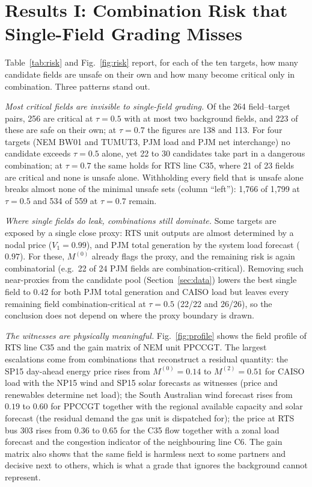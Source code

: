 \section{Results I: Combination Risk that Single-Field Grading Misses}\label{sec:res-risk}



Table~\ref{tab:risk} and Fig.~\ref{fig:risk} report, for each of the ten targets, how many
candidate fields are unsafe on their own and how many become critical only in combination.
Three patterns stand out.

\emph{Most critical fields are invisible to single-field grading.} Of the 264 field--target
pairs, 256 are critical at $\tau=0.5$ with at most two background fields, and 223 of these are
safe on their own; at $\tau=0.7$ the figures are 138 and 113. For four targets (NEM BW01 and
TUMUT3, PJM load and PJM net interchange) no candidate exceeds $\tau=0.5$ alone, yet 22 to 30
candidates take part in a dangerous combination; at $\tau=0.7$ the same holds for RTS line C35,
where 21 of 23 fields are critical and none is unsafe alone. Withholding every field that is unsafe alone
breaks almost none of the minimal unsafe sets (column ``left''): 1,766 of 1,799 at $\tau=0.5$
and 534 of 559 at $\tau=0.7$ remain.

\emph{Where single fields do leak, combinations still dominate.} Some targets are exposed by a
single close proxy: RTS unit outputs are almost determined by a nodal price ($V_1=0.99$), and
PJM total generation by the system load forecast ($0.97$). For these, $M^{(0)}$ already flags
the proxy, and the remaining risk is again combinatorial (e.g.\ 22 of 24 PJM fields are
combination-critical). Removing such near-proxies from the candidate pool
(Section~\ref{sec:data}) lowers the best single field to $0.42$ for both PJM total generation
and CAISO load but leaves every remaining field combination-critical at $\tau=0.5$ (22/22 and
26/26), so the conclusion does not depend on where the proxy boundary is drawn.

\emph{The witnesses are physically meaningful.} Fig.~\ref{fig:profile} shows the field profile
of RTS line C35 and the gain matrix of NEM unit PPCCGT. The largest escalations come from
combinations that reconstruct a residual quantity: the SP15 day-ahead energy price rises from
$M^{(0)}=0.14$ to $M^{(2)}=0.51$ for CAISO load with the NP15 wind and SP15 solar forecasts as
witnesses (price and renewables determine net load); the South Australian wind forecast rises
from $0.19$ to $0.60$ for PPCCGT together with the regional available capacity and solar
forecast (the residual demand the gas unit is dispatched for); the price at RTS bus 303 rises
from $0.36$ to $0.65$ for the C35 flow together with a zonal load forecast and the congestion
indicator of the neighbouring line C6. The gain matrix also shows that the same field is
harmless next to some partners and decisive next to others, which is what a grade that ignores
the background cannot represent.

